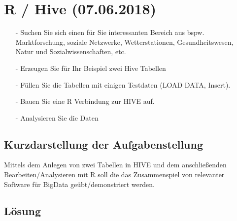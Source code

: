 \section{R / Hive (07.06.2018)}
\begin{itemize}
\item[-] Suchen Sie sich einen für Sie interessanten Bereich aus bspw. Marktforschung, soziale Netzwerke, Wetterstationen, Gesundheitswesen, Natur und Sozialwissenschaften, etc.
\item[-] Erzeugen Sie für Ihr Beispiel zwei Hive Tabellen
\item[-] Füllen Sie die Tabellen mit einigen Testdaten (LOAD DATA, Insert).
\item[-] Bauen Sie eine R Verbindung zur HIVE auf.
\item[-] Analysieren Sie die Daten
\end{itemize}
\subsection*{Kurzdarstellung der Aufgabenstellung}
Mittels dem Anlegen von zwei Tabellen in HIVE und dem anschließenden Bearbeiten/Analysieren mit R soll die das Zusammenspiel von relevanter Software für BigData geübt/demonstriert werden.
\subsection*{Lösung}
